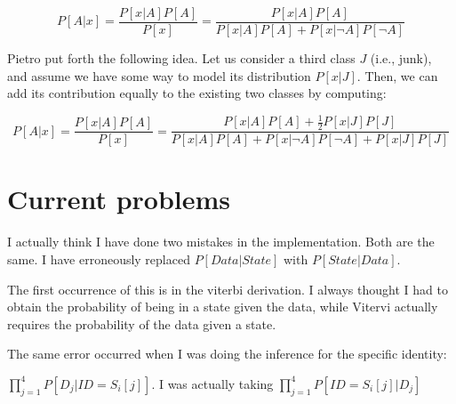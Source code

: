\documentclass[12pt]{article}
\begin{document}
\begin{equation}
\label{Eq3}
P\left[ {A|x} \right] = \frac{{P\left[ {x|A} \right]P\left[ A \right]}}{{P\left[ x \right]}} = \frac{{P\left[ {x|A} \right]P\left[ A \right]}}{{P\left[ {x|A} \right]P\left[ A \right] + P\left[ {x|\neg A} \right]P\left[ {\neg A} \right]}}
\end{equation}

Pietro put forth the following idea. Let us consider a third class $J$ (i.e., junk), and assume we have some way to model its distribution $P\left[ {x|J} \right]$. Then, we can add its contribution equally to the existing two classes by computing:

\begin{equation}
\label{Eq4}
P\left[ {A|x} \right] = \frac{{P\left[ {x|A} \right]P\left[ A \right]}}{{P\left[ x \right]}} = \frac{{P\left[ {x|A} \right]P\left[ A \right] + \frac{1}{2}P\left[ {x|J} \right]P\left[ J \right]}}{{P\left[ {x|A} \right]P\left[ A \right] + P\left[ {x|\neg A} \right]P\left[ {\neg A} \right] + P\left[ {x|J} \right]P\left[ J \right]}}
\end{equation}

\section{Current problems}

I actually think I have done two mistakes in the implementation. Both are the same. 
I have erroneously replaced $P\left[ {Data|State} \right]$ with  $P\left[ {State|Data} \right]$.

The first occurrence of this is in the viterbi derivation. I always thought I had to obtain the probability of being in a state given the data, while Vitervi actually requires the probability of the data given a state. 

The same error occurred when I was doing the inference for the specific identity:

$\prod\limits_{j = 1}^4 {P\left[ {{D_j}|ID = {S_i}[j]} \right]} $. I was actually taking
$\prod\limits_{j = 1}^4 {P\left[ {ID = {S_i}[j]|{D_j}} \right]} $
\end{document}
